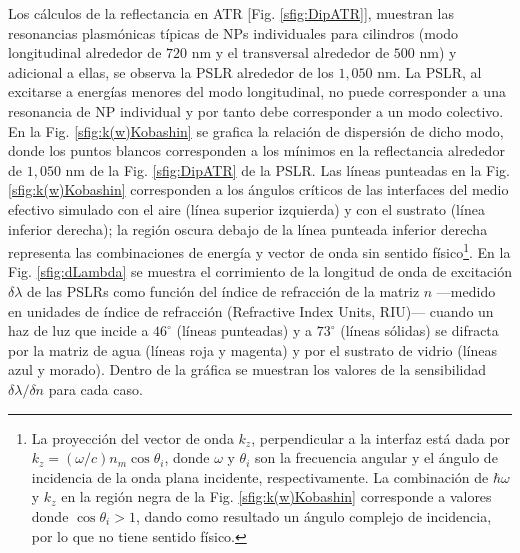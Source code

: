 Los cálculos de la reflectancia en ATR [Fig. \ref{sfig:DipATR}], muestran las resonancias plasmónicas típicas de NPs individuales para cilindros (modo longitudinal alrededor de $720$ nm y el transversal alrededor de $500$ nm) y adicional a ellas, se observa la PSLR alrededor de los $1,050$ nm. La PSLR, al excitarse a energías menores del modo longitudinal, no puede corresponder a una resonancia de NP individual y por tanto debe corresponder a un modo colectivo. En la Fig.  \ref{sfig:k(w)Kobashin} se grafica la relación de dispersión de dicho modo, donde los puntos blancos corresponden a los mínimos en la reflectancia alrededor de $1,050$ nm de la Fig.  \ref{sfig:DipATR} de la PSLR.  Las líneas punteadas en la Fig.   \ref{sfig:k(w)Kobashin} corresponden a los ángulos críticos de las interfaces del medio efectivo simulado con el aire (línea superior izquierda) y con el sustrato (línea inferior derecha); la región oscura debajo de la línea punteada inferior derecha representa las combinaciones de energía y vector de onda sin sentido físico\footnote{La proyección del vector de onda $k_z$, perpendicular a la interfaz está dada por $k_z = (\omega / c)n_m\cos\theta_i$, donde $\omega$ y $\theta_i$ son la frecuencia angular y el ángulo de incidencia de la onda plana incidente, respectivamente. La combinación de $\hbar\omega$ y $k_z$ en la región negra de la Fig. \ref{sfig:k(w)Kobashin} corresponde a valores donde $\cos\theta_i>1$, dando como resultado un ángulo complejo de incidencia, por lo que no tiene sentido físico.}.  En la Fig.  \ref{sfig:dLambda} se muestra el corrimiento de la longitud de onda de excitación $\delta\lambda$ de las PSLRs como función del índice de refracción de la matriz $n$ ---medido en unidades de índice de refracción (Refractive Index Units, RIU)--- cuando un haz de luz que incide a $46^\circ$ (líneas punteadas) y  a $73^\circ$ (líneas sólidas) se difracta por la matriz de agua (líneas roja y magenta) y por el sustrato de vidrio (líneas azul y morado). Dentro de la gráfica se muestran los valores de la sensibilidad $\delta \lambda/\delta n$ para cada caso.  


